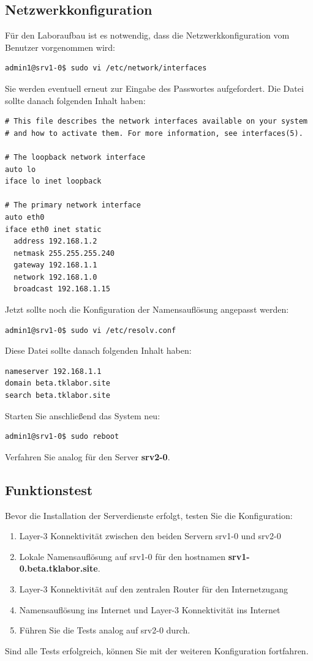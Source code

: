 \subsection{Netzwerkkonfiguration}
Für den Laboraufbau ist es notwendig, dass die Netzwerkkonfiguration vom
Benutzer vorgenommen wird:
\begin{lstlisting}
admin1@srv1-0$ sudo vi /etc/network/interfaces
\end{lstlisting}
Sie werden eventuell erneut zur Eingabe des Passwortes aufgefordert. Die Datei
sollte danach folgenden Inhalt haben:
\begin{lstlisting}
# This file describes the network interfaces available on your system
# and how to activate them. For more information, see interfaces(5).

# The loopback network interface
auto lo
iface lo inet loopback

# The primary network interface
auto eth0
iface eth0 inet static
  address 192.168.1.2
  netmask 255.255.255.240
  gateway 192.168.1.1
  network 192.168.1.0
  broadcast 192.168.1.15
\end{lstlisting}
Jetzt sollte noch die Konfiguration der Namensauflösung angepasst werden:
\begin{lstlisting}
admin1@srv1-0$ sudo vi /etc/resolv.conf
\end{lstlisting}
Diese Datei sollte danach folgenden Inhalt haben:
\begin{lstlisting}
nameserver 192.168.1.1
domain beta.tklabor.site
search beta.tklabor.site
\end{lstlisting}
Starten Sie anschließend das System neu:
\begin{lstlisting}
admin1@srv1-0$ sudo reboot
\end{lstlisting}
Verfahren Sie analog für den Server \textbf{srv2-0}.

\subsection{Funktionstest}
Bevor die Installation der Serverdienste erfolgt, testen Sie die Konfiguration:
\begin{enumerate}
  \item Layer-3 Konnektivität zwischen den beiden Servern srv1-0 und srv2-0
  \item Lokale Namensauflösung auf srv1-0 für den hostnamen
  \textbf{srv1-0.beta.tklabor.site}.
  \item Layer-3 Konnektivität auf den zentralen Router für den Internetzugang
  \item Namensauflösung ins Internet und Layer-3 Konnektivität ins Internet
  \item Führen Sie die Tests analog auf srv2-0 durch.
\end{enumerate}

Sind alle Tests erfolgreich, können Sie mit der weiteren Konfiguration
fortfahren.
